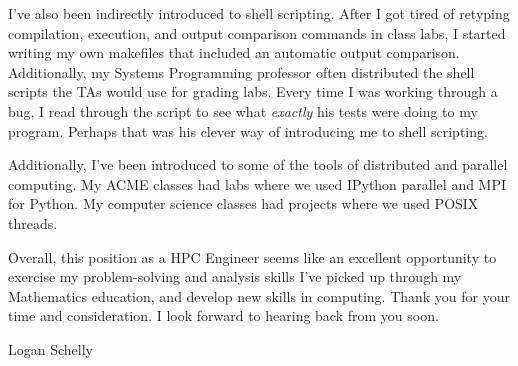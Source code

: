 \documentclass{article}
\begin{document}
I've also been indirectly introduced to shell scripting.
After I got tired of retyping compilation, execution, and output comparison commands in class labs,
I started writing my own makefiles that included an automatic output comparison.
Additionally, my Systems Programming professor often distributed the shell scripts the TAs would use for grading labs.
Every time I was working through a bug, I read through the script to see what \emph{exactly} his tests were doing to my program.
Perhaps that was his clever way of introducing me to shell scripting.

Additionally, I've been introduced to some of the tools of distributed and parallel computing.
My ACME classes had labs where we used IPython parallel and MPI for Python.
My computer science classes had projects where we used POSIX threads.

Overall, this position as a HPC Engineer seems like an excellent opportunity to exercise my 
problem-solving and analysis skills I've picked up through my Mathematics education,
and develop new skills in computing.
Thank you for your time and consideration.
I look forward to hearing back from you soon.

\bigskip
\noindent Logan Schelly
  
\end{document}
